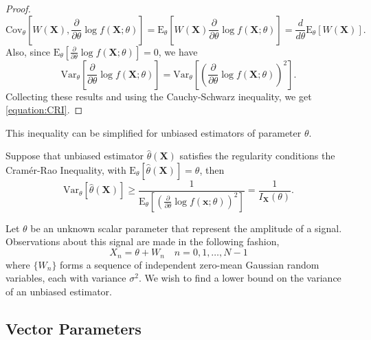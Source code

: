 \begin{proof}
\begin{equation*}
\mathrm{Cov}_{\theta} \left[ W(\mathbf{X}), \frac{\partial}{\partial \theta} \log f(\mathbf{X}; \theta) \right]
= \mathrm{E}_{\theta} \left[ W(\mathbf{X}) \frac{\partial}{\partial \theta} \log f(\mathbf{X}; \theta) \right]
= \frac{d}{d \theta} \mathrm{E}_{\theta} \left[ W(\mathbf{X}) \right] .
\end{equation*}
Also, since
$\mathrm{E}_{\theta} \left[ \frac{\partial}{\partial \theta} \log f(\mathbf{X}; \theta) \right] = 0$, we have
\begin{equation*}
\mathrm{Var}_{\theta} \left[ \frac{\partial}{\partial \theta} \log f(\mathbf{X}; \theta) \right]
= \mathrm{Var}_{\theta} \left[ \left( \frac{\partial}{\partial \theta} \log f(\mathbf{X}; \theta) \right)^2 \right] .
\end{equation*}
Collecting these results and using the Cauchy-Schwarz inequality, we get \eqref{equation:CRI}.
\end{proof}

This inequality can be simplified for unbiased estimators of parameter $\theta$.
\begin{corollary}
Suppose that unbiased estimator $\hat{\theta} (\mathbf{X})$ satisfies the regularity conditions the Cram\'{e}r-Rao Inequality, with $\mathrm{E}_{\theta} \left[ \hat{\theta} (\mathbf{X}) \right] = \theta$, then
\begin{equation} \label{equation:CRLB}
\mathrm{Var}_{\theta} \left[ \hat{\theta}(\mathbf{X}) \right]
\geq \frac{1}
{\mathrm{E}_{\theta} \left[ \left( \frac{\partial}{\partial \theta} \log f(\mathbf{x}; \theta) \right)^2 \right]}
= \frac{1}{I_{\mathbf{X}} (\theta)} .
\end{equation}
\end{corollary}





\begin{example}
Let $\theta$ be an unknown scalar parameter that represent the amplitude of a signal.
Observations about this signal are made in the following fashion,
\begin{equation*}
X_n = \theta + W_n \quad n = 0, 1, \ldots, N-1
\end{equation*}
where $\{ W_n \}$ forms a sequence of independent zero-mean Gaussian random variables, each with variance $\sigma^2$.
We wish to find a lower bound on the variance of an unbiased estimator.
\end{example}


\subsection{Vector Parameters}

